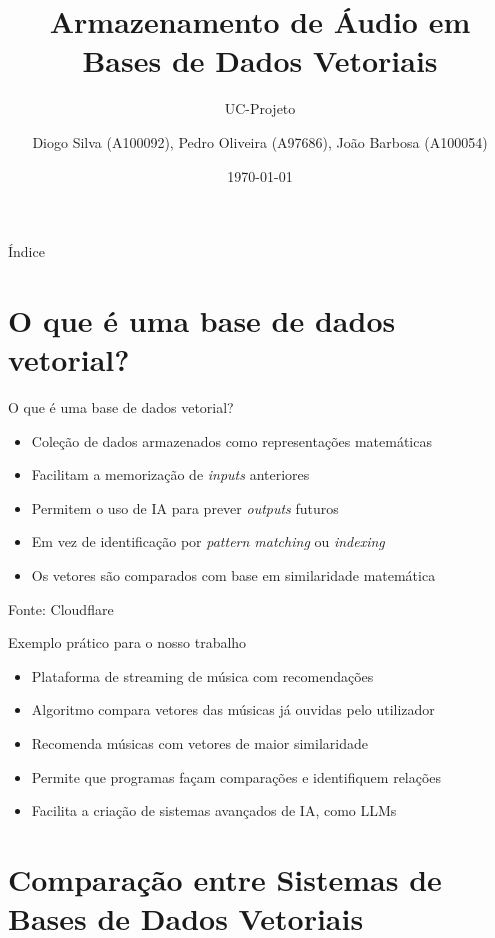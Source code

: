 \documentclass{beamer}
\title{Armazenamento de Áudio em Bases de Dados Vetoriais}
\subtitle{UC-Projeto}
\author{Diogo Silva (A100092), Pedro Oliveira (A97686), João Barbosa (A100054)}
\institute{Universidade do Minho}
\date{\today}
\begin{document}
\begin{frame}
    \titlepage
\end{frame}

\begin{frame}{Índice}
    \tableofcontents
\end{frame}

\section{O que é uma base de dados vetorial?}

\begin{frame}{O que é uma base de dados vetorial?}
    \begin{itemize}
        \item Coleção de dados armazenados como representações matemáticas
        \item Facilitam a memorização de \textit{inputs} anteriores
        \item Permitem o uso de IA para prever \textit{outputs} futuros
        \item Em vez de identificação por \textit{pattern matching} ou \textit{indexing}
        \item Os vetores são comparados com base em similaridade matemática
    \end{itemize}
    
    \vspace{0.5cm}
    \footnotesize{Fonte: Cloudflare}
\end{frame}

\begin{frame}{Exemplo prático para o nosso trabalho}
    \begin{itemize}
        \item Plataforma de streaming de música com recomendações
        \item Algoritmo compara vetores das músicas já ouvidas pelo utilizador
        \item Recomenda músicas com vetores de maior similaridade
        \item Permite que programas façam comparações e identifiquem relações
        \item Facilita a criação de sistemas avançados de IA, como LLMs
    \end{itemize}
\end{frame}

\section{Comparação entre Sistemas de Bases de Dados Vetoriais}
\end{document}
